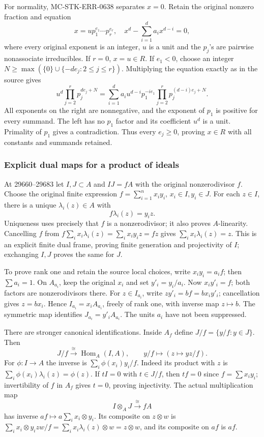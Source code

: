 For normality, MC-\AlgebraIdentifierBreak{}STK-\AlgebraIdentifierBreak{}ERR-\AlgebraIdentifierBreak{}0638 separates \(x=0\). Retain the original nonzero fraction and equation \[
 x=u p_1^{e_1}\cdots p_r^{e_r},\quad
 x^d-\sum_{i=1}^d a_i x^{d-i}=0,
\] where every original exponent is an integer, \(u\) is a unit and the \(p_j\)'s are pairwise nonassociate irreducibles. If \(r=0\), \(x=u\in R\). If \(e_1<0\), choose an integer \(N\ge\max(\{0\}\cup\{-d e_j:2\le j\le r\})\). Multiplying the equation exactly as in the source gives \[
 u^d\prod_{j=2}^r p_j^{de_j+N}
 =\sum_{i=1}^d a_i u^{d-i}p_1^{-i e_1}
                  \prod_{j=2}^r p_j^{(d-i)e_j+N}.
\] All exponents on the right are nonnegative, and the exponent of \(p_1\) is positive for every summand. The left has no \(p_1\) factor and its coefficient \(u^d\) is a unit. Primality of \(p_1\) gives a contradiction. Thus every \(e_j\ge0\), proving \(x\in R\) with all constants and summands retained.

\subsubsection{Explicit dual maps for a product of ideals}\label{algebra-proof-029-explicit-dual-maps-for-a-product-of-ideals}

At 29660--29683 let \(I,J\subset A\) and \(IJ=fA\) with the original nonzerodivisor \(f\). Choose the original finite expression \(f=\sum_{i=1}^n x_i y_i\), \(x_i\in I,y_i\in J\). For each \(z\in I\), there is a unique \(\lambda_i(z)\in A\) with \[
 f\lambda_i(z)=y_i z.
\] Uniqueness uses precisely that \(f\) is a nonzerodivisor; it also proves \(A\)-linearity. Cancelling \(f\) from \(f\sum_i x_i\lambda_i(z)=\sum_i x_i y_i z=fz\) gives \(\sum_i x_i\lambda_i(z)=z\). This is an explicit finite dual frame, proving finite generation and projectivity of \(I\); exchanging \(I,J\) proves the same for \(J\).

To prove rank one and retain the source local choices, write \(x_i y_i=a_i f\); then \(\sum a_i=1\). On \(A_{a_i}\), keep the original \(x_i\) and set \(y'_i=y_i/a_i\). Now \(x_i y'_i=f\); both factors are nonzerodivisors there. For \(z\in I_{a_i}\), write \(z y'_i=b f=b x_i y'_i\); cancellation gives \(z=b x_i\). Hence \(I_{a_i}=x_i A_{a_i}\), freely of rank one, with inverse map \(z\mapsto b\). The symmetric map identifies \(J_{a_i}=y'_i A_{a_i}\). The units \(a_i\) have not been suppressed.

There are stronger canonical identifications. Inside \(A_f\) define \(J/f=\{y/f:y\in J\}\). Then \[
 J/f\xrightarrow{\;\cong\;}\operatorname{Hom}_A(I,A),
 \qquad y/f\longmapsto(z\mapsto yz/f).
\] For \(\phi:I\to A\) the inverse is \(\sum_i\phi(x_i)y_i/f\). Indeed its product with \(z\) is \(\sum_i\phi(x_i)\lambda_i(z)=\phi(z)\). If \(tI=0\) with \(t\in J/f\), then \(tf=0\) since \(f=\sum x_i y_i\); invertibility of \(f\) in \(A_f\) gives \(t=0\), proving injectivity. The actual multiplication map \[
 I\otimes_A J\xrightarrow{\;\cong\;}fA
\] has inverse \(af\mapsto a\sum_i x_i\otimes y_i\). Its composite on \(z\otimes w\) is \(\sum_i x_i\otimes y_i zw/f=\sum_i x_i\lambda_i(z)\otimes w=z\otimes w\), and its composite on \(af\) is \(af\).

